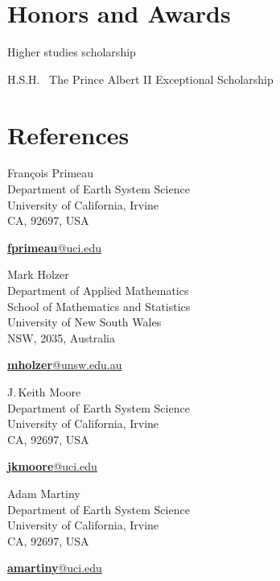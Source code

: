\documentclass[12pt]{friggeri-cv}
\makeatletter
\newcommand{\cvRefsTwoCols}[2]{
  \begin{minipage}[t]{.45\textwidth}#1\end{minipage}
  \hfill
  \begin{minipage}[t]{.45\textwidth}#2\end{minipage}
}
\newcommand{\cvreference}[4]{
    {\headingfont\color{headercolor}#1}\\
    {#2}
    \begin{flushright}
    {\href{mailto:#3@#4}{\textbf{#3}@#4}\\}
    \end{flushright}
}
\makeatother
\begin{document}
\newpage
\section{Honors and Awards}
\begin{entrylist}

  {}

  {}

  {Higher studies scholarship}

  {H.S.H.~ The Prince Albert II Exceptional Scholarship}

  {}

  {}


\end{entrylist}







\section{References}
\cvRefsTwoCols{
   \label{FP}
  \cvreference
    {Fran\c{c}ois Primeau}
    {Department of Earth System Science\\
     University of California, Irvine\\
     CA, 92697, USA}
    {fprimeau}
    {uci.edu}
  \phantomsection \label{MH}
  \cvreference
    {Mark Holzer}
    {Department of Applied Mathematics\\
     School of Mathematics and Statistics\\
     University of New South Wales\\
     NSW, 2035, Australia}
    {mholzer}
    {unsw.edu.au}
}
{%
  \phantomsection \label{JKM}
  \cvreference
    {J.\,Keith Moore}
    {Department of Earth System Science\\
     University of California, Irvine\\
     CA, 92697, USA}
    {jkmoore}
    {uci.edu}
  \phantomsection \label{AM}
  \cvreference
    {Adam Martiny}
    {Department of Earth System Science\\
     University of California, Irvine\\
     CA, 92697, USA}
    {amartiny}
    {uci.edu}
}
\vspace{10pt}
\end{document}
